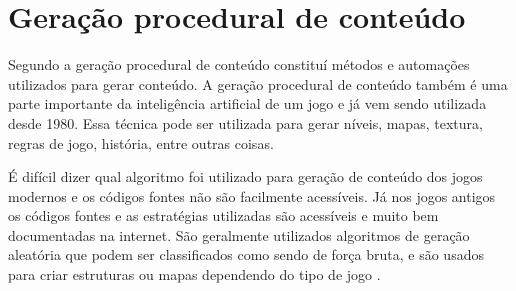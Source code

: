 \section{Geração procedural de conteúdo}

Segundo  a geração procedural de conteúdo constituí métodos e automações utilizados para gerar conteúdo. A geração procedural de conteúdo também é uma parte importante da inteligência artificial de um jogo e já vem sendo utilizada desde 1980.
Essa técnica pode ser utilizada para gerar níveis, mapas, textura, regras de jogo, história, entre outras coisas.

É difícil dizer qual algoritmo foi utilizado para geração de conteúdo dos jogos modernos e os códigos fontes não são facilmente acessíveis. Já nos jogos antigos os códigos fontes e as estratégias utilizadas são acessíveis e muito bem documentadas na internet. São geralmente utilizados algoritmos de geração aleatória que podem ser classificados como sendo de força bruta, e são usados para criar estruturas ou mapas dependendo do tipo de jogo \space\cite{dormans2010adventures}.
